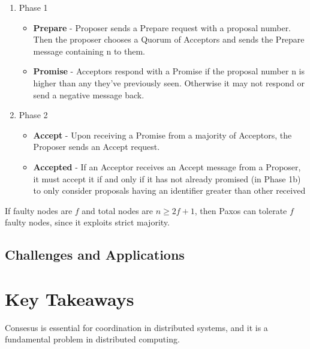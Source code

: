 \begin{enumerate}
   \item Phase 1
   \begin{itemize}
      \item \textbf{Prepare} - 
      Proposer sends a Prepare request with a proposal number. Then the proposer chooses a Quorum of Acceptors and sends the Prepare message containing n to them.
      \item \textbf{Promise} - 
      Acceptors respond with a Promise if the proposal number n is higher than any they've previously seen. Otherwise it may not respond or send a negative message back.
   \end{itemize}
   \item Phase 2
   \begin{itemize}
      \item \textbf{Accept} -
      Upon receiving a Promise from a majority of Acceptors, the Proposer sends an Accept request.
      \item \textbf{Accepted} -
      If an Acceptor receives an Accept message from a Proposer, it must accept it if and only if it has not already promised (in Phase 1b) to only consider proposals having an identifier greater than other received
   \end{itemize}
\end{enumerate}

If faulty nodes are $f$ and total nodes are $n \geq 2f + 1 $, then Paxos can tolerate $f$ faulty nodes, since it exploits strict majority.

\subsection{Challenges and Applications}

\section{Key Takeaways}
Consesus is essential for coordination in distributed systems, and it is a fundamental problem in distributed computing.

